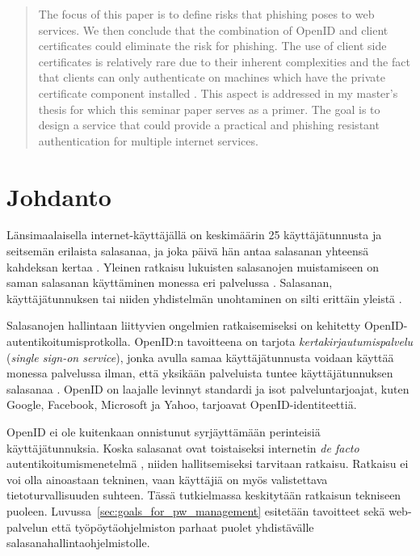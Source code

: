 \documentclass[english,gradu]{tktltiki}
\begin{document}
\begin{abstract}
The focus of this paper is to define risks that phishing poses to web services. We then conclude that the combination of OpenID and client certificates could eliminate the risk for phishing. The use of client side certificates is relatively rare due to their inherent complexities and the fact that clients can only authenticate on machines which have the private certificate component installed \cite{owasp_tls_cheatsheet}. This aspect is addressed in my master's thesis for which this seminar paper serves as a primer. The goal is to design a service that could provide a practical and phishing resistant authentication for multiple internet services.

\end{abstract}

\setcounter{tocdepth}{3}
\mytableofcontents


\section{Johdanto} %
\label{sec:johdanto}


Länsimaalaisella internet-käyttäjällä on keskimäärin 25 käyttäjätunnusta ja seitsemän erilaista salasanaa, ja joka päivä hän antaa salasanan yhteensä kahdeksan kertaa \cite{study_of_passwords_07}. Yleinen ratkaisu lukuisten salasanojen muistamiseen on  saman salasanan käyttäminen monessa eri palvelussa \cite{password_management_strategies_06}. Salasanan, käyttäjätunnuksen tai niiden yhdistelmän unohtaminen on silti erittäin yleistä \cite{will_we_ever_escape_passwords_05}.

Salasanojen hallintaan liittyvien ongelmien ratkaisemiseksi on kehitetty OpenID-autentikoitumisprotkolla. OpenID:n tavoitteena on tarjota \emph{kertakirjautumispalvelu} (\emph{single sign-on service}), jonka avulla samaa käyttäjätunnusta voidaan käyttää monessa palvelussa ilman, että yksikään palveluista tuntee käyttäjätunnuksen salasanaa \cite{openid_2.0_platform_2009}. OpenID on laajalle levinnyt standardi ja isot palveluntarjoajat, kuten Google, Facebook, Microsoft ja Yahoo, tarjoavat OpenID-identiteettiä.

OpenID ei ole kuitenkaan onnistunut syrjäyttämään perinteisiä käyttäjätunnuksia. Koska salasanat ovat toistaiseksi internetin \emph{de facto} autentikoitumismenetelmä \cite{study_of_passwords_07, passpet_06, password_management_strategies_06, pwdhash_extension_05}, niiden hallitsemiseksi tarvitaan ratkaisu. Ratkaisu ei voi olla ainoastaan tekninen, vaan käyttäjiä on myös valistettava tietoturvallisuuden suhteen. Tässä tutkielmassa keskitytään ratkaisun tekniseen puoleen. Luvussa~\ref{sec:goals_for_pw_management} esitetään tavoitteet sekä web-palvelun että työpöytäohjelmiston parhaat puolet yhdistävälle salasanahallintaohjelmistolle.
\end{document}
